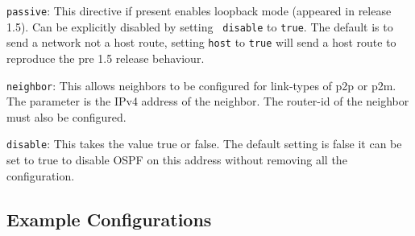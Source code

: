\begin{description}
\begin{description}
\begin{description}
\begin{description}
\begin{description}
\begin{description}
\item{\tt passive}: This directive if present enables loopback mode
(appeared in release 1.5). Can be explicitly disabled by setting {\tt
disable} to {\tt true}. The default is to send a network not a host
route, setting {\tt host} to {\tt true} will send a host route to
reproduce the pre 1.5 release behaviour.

\item{\tt neighbor}: This allows neighbors to be configured for {\stt
link-type}s of {\stt p2p} or {\stt p2m}. The parameter is the IPv4
address of the neighbor. The {\stt router-id} of the neighbor must
also be configured.
\item{\tt disable}:  This takes the value {\stt true} or {\stt
false}. The default setting is {\stt false} it can be set to {\stt
true} to disable OSPF on this address without removing all the configuration.
\end{description}
\end{description}
\end{description}
\end{description}

\end{description}
\end{description}

\subsection{Example Configurations}

